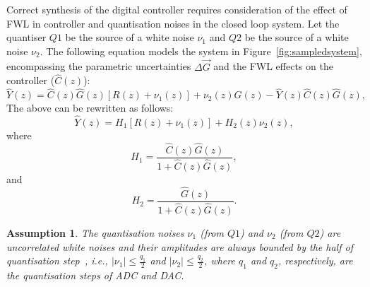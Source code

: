 \documentclass{sig-alternate-05-2015}
\newtheorem{myassumption}{Assumption}
\begin{document}
Correct synthesis of the digital controller requires consideration of the
effect of FWL in controller and quantisation noises in the closed loop
system.  Let the quantiser $Q1$ be the source of a white noise $\nu_{1}$ and
$Q2$ be the source of a white noise $\nu_{2}$.  The following equation
models the system in Figure~\ref{fig:sampledsystem}, encompassing the
parametric uncertainties $\Delta \vec{G}$ and the FWL effects on
the controller ($\hat{C}(z)$):
%
\begin{equation}
\hat{Y}(z)=\hat{C}(z)\hat{G}(z)[R(z)+\nu_{1}(z)]+\nu_{2}(z)\hat{G}(z)-\hat{Y}(z)\hat{C}(z)\hat{G}(z),
\end{equation}
%
The above can be rewritten as follows:
%
\begin{equation}
\label{eq:outputfunctions}
\hat{Y}(z)=H_{1}[R(z)+\nu_{1}(z)]+H_{2}(z)\nu_{2}(z),
\end{equation}
%
where
%
\begin{equation}
H_{1}=\frac{\hat{C}(z)\hat{G}(z)}{1+\hat{C}(z)\hat{G}(z)},
\end{equation}
%
and
%
\begin{equation}
H_{2}=\frac{\hat{G}(z)}{1+\hat{C}(z)\hat{G}(z)}.
\end{equation}

\begin{myassumption}
\label{whitenoise}
%
The quantisation noises $\nu_{1}$ (from $Q1$) and $\nu_{2}$ (from $Q2$) are
uncorrelated white noises and their amplitudes are always bounded by the
half of quantisation step~\cite{astrom1997computer}, i.e., $\vert \nu_{1}
\vert \leq \frac{q_{1}}{2}$ and $\vert \nu_{2} \vert \leq \frac{q_{2}}{2}$,
where $q_{1}$ and $q_{2}$, respectively, are the quantisation steps of ADC
and DAC.
% 
\end{myassumption}
\end{document}
